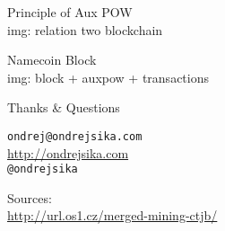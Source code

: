 \documentclass{beamer}
\begin{document}
\begin{frame}

    {\Huge Principle of Aux POW}\\


    img: relation two blockchain

\end{frame}

\begin{frame}

    {\Huge Namecoin Block}\\

    img: block + auxpow + transactions



\end{frame}


\begin{frame}

    {\Huge Thanks \& Questions}\\

    \vspace{1cm}

    \texttt{ondrej@ondrejsika.com}\\
    \url{http://ondrejsika.com}\\
    \texttt{@ondrejsika}\\

    \vspace{1cm}

    Sources:\\
    \url{http://url.os1.cz/merged-mining-ctjb/}
\end{frame}
\end{document}
